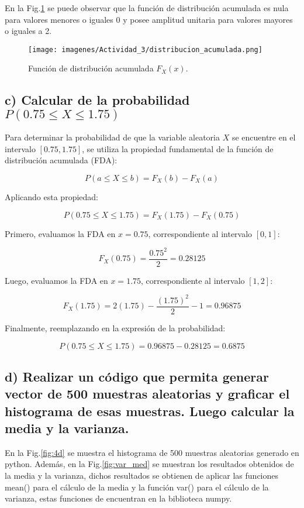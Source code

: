     En la Fig.\ref{fig:4b} se puede observar que la función de distribución acumulada es nula para valores menores o iguales 0 y posee amplitud unitaria 
    para valores mayores o iguales a 2.\par

        \begin{figure}[H]
            \centering
            \texttt{[image: imagenes/Actividad\_3/distribucion\_acumulada.png]}
            \caption{Función de distribución acumulada \(F_X(x)\).}
            \label{fig:4b}
        \end{figure}

\subsection*{c) Calcular de la probabilidad \( P(0.75 \leq X \leq 1.75) \)}

	Para determinar la probabilidad de que la variable aleatoria \(X\) se encuentre en el intervalo \([0.75, 1.75]\), se utiliza la propiedad fundamental de la función de distribución acumulada (FDA):
	
	\[
		P(a \leq X \leq b) = F_X(b) - F_X(a)
	\]
	
	Aplicando esta propiedad:
	
	\[
		P(0.75 \leq X \leq 1.75) = F_X(1.75) - F_X(0.75)
	\]
	
	Primero, evaluamos la FDA en \(x = 0.75\), correspondiente al intervalo \([0,1]\):
	
	\[
		F_X(0.75) = \frac{0.75^2}{2} = 0.28125
	\]
	
	Luego, evaluamos la FDA en \(x = 1.75\), correspondiente al intervalo \([1,2]\):
	
	\[
		F_X(1.75) = 2(1.75) - \frac{(1.75)^2}{2} - 1 = 0.96875
	\]
	
	Finalmente, reemplazando en la expresión de la probabilidad:
	
	\[
		P(0.75 \leq X \leq 1.75) = 0.96875 - 0.28125 = 0.6875
	\]

	
\subsection*{d) Realizar un código que permita generar vector de 500 muestras aleatorias y graficar el histograma de esas muestras. Luego calcular la media 
	y la varianza.}
	
	
	En la Fig.\ref{fig:4d} se muestra el histograma de 500 muestras aleatorias generado en python. Además, en la Fig.\ref{fig:var_med} se muestran los resultados obtenidos de la media y la varianza, dichos resultados se obtienen de aplicar las funciones mean() para el cálculo de la media y la función var() para el cálculo de la varianza, estas funciones de encuentran en la biblioteca numpy. 
	
